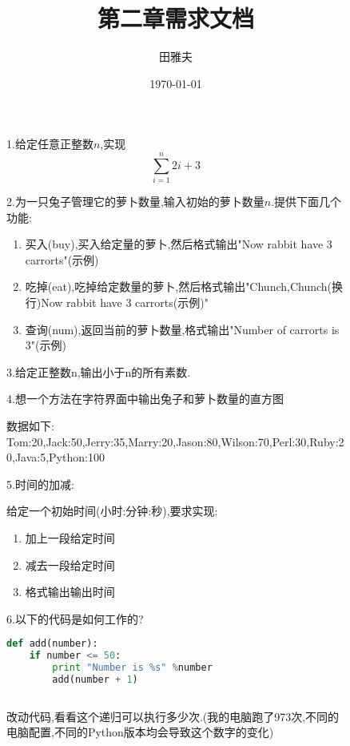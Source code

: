 \documentclass[12pt,a4paper]{article}
\title{第二章需求文档}	%
\author{田雅夫}
\date{\today}
\begin{document}
\maketitle

\begin{figure}[H]
1.给定任意正整数$n$,实现
\begin{equation}
\sum^{n}_{i=1}2i+3
\end{equation}
\end{figure}

\begin{figure}[H]
2.为一只兔子管理它的萝卜数量,输入初始的萝卜数量$n$.提供下面几个功能:
\begin{enumerate}
\item 买入(buy),买入给定量的萝卜,然后格式输出"Now rabbit have 3 carrorts"(示例)
\item 吃掉(eat),吃掉给定数量的萝卜,然后格式输出"Chunch,Chunch(换行)Now rabbit have 3 carrorts(示例)"
\item 查询(num),返回当前的萝卜数量,格式输出"Number of carrorts is 3"(示例)
\end{enumerate}
\end{figure}

\begin{figure}[H]
3.给定正整数n,输出小于n的所有素数.
\end{figure}

\begin{figure}[H]
4.想一个方法在字符界面中输出兔子和萝卜数量的直方图

数据如下:\\
Tom:20,Jack:50,Jerry:35,Marry:20,Jason:80,Wilson:70,Perl:30,Ruby:20,Java:5,Python:100
\end{figure}

\begin{figure}[H]
5.时间的加减:

给定一个初始时间(小时:分钟:秒),要求实现:
\begin{enumerate}
\item 加上一段给定时间
\item 减去一段给定时间
\item 格式输出输出时间
\end{enumerate}
\end{figure}

\begin{figure}[H]
6.以下的代码是如何工作的?
\begin{lstlisting}[language=Python]
def add(number):
    if number <= 50:
        print "Number is %s" %number
        add(number + 1)
     
\end{lstlisting}
改动代码,看看这个递归可以执行多少次.(我的电脑跑了973次,不同的电脑配置,不同的Python版本均会导致这个数字的变化)
\end{figure}
\end{document}
